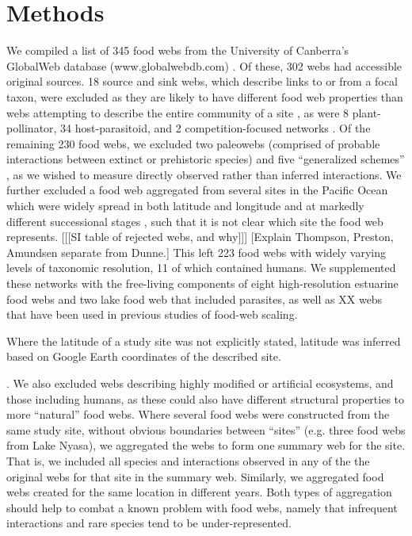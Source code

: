 \documentclass[12pt]{article}
\begin{document}
\section*{Methods}

We compiled a list of 345 food webs from the University of Canberra's GlobalWeb database (www.globalwebdb.com) 
\citep{}. Of these, 302 webs had accessible original sources. 
18 source and sink webs, which describe links to or from a focal taxon, were excluded as they are likely 
to have different food web properties than webs attempting to
describe the entire community of a site \citep{Williams2002}, as were 8 plant-pollinator, 34 host-parasitoid, and 2 
competition-focused networks
\citep{Riede2010}. Of the remaining 230 food webs, we excluded two paleowebs (comprised of probable interactions 
between extinct or prehistoric species) \citep{Simenstad1978} and five ``generalized schemes'' 
\citep{Nybakken1982,Percival1929,Swan1961,Landry1977,Petipa1979,Harrison1963}, as 
we wished to measure
directly observed rather than inferred interactions. We further excluded a food web aggregated from several sites in 
the Pacific Ocean which were widely spread in both latitude and longitude and at markedly different successional stages
\citep{Vinogradov1978}, such that it is not clear which site the food web represents. [[[SI table of rejected webs, and why]]] 
[Explain Thompson, Preston, Amundsen separate from Dunne.]
This left 223 food webs with widely varying levels of taxonomic resolution, 11 of which contained humans. 
We supplemented these networks with the free-living components of eight high-resolution estuarine food webs \citep{Dunne2013,Thompson2005} and two lake food web \citep{Preston2012,Amundsen2013} that 
included parasites, as well as XX webs that have been used in previous studies of food-web scaling. 


Where the latitude of a study site was not 
explicitly stated, latitude was inferred based on Google Earth \citep{} coordinates of the described site.


. We also excluded webs describing highly
modified or artificial ecosystems, and those including humans, as these could also
have different structural properties to more ``natural'' food webs.
Where several food webs were constructed from the same study site, without obvious boundaries between ``sites'' (e.g. three food
webs from Lake Nyasa), we aggregated the webs to form one summary web for the site. That is, we included all species and
interactions observed in any of the the original webs for that site in the summary web.
Similarly, we aggregated food webs created for the same location in different years. Both types of
aggregation should help to combat a known problem with food webs, namely that infrequent interactions and
rare species tend to be under-represented.
\end{document}
